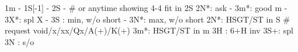 1m - 1S[-1] - 2S -  # or anytime showing 4-4 fit in 2S
2N*: ask
   - 3m*: good m
   - 3X*: spl X
   - 3S : min, w/o short
   - 3N*: max, w/o short
2N*: HSGT/ST in S  # request void/x/xx/Qx/A(+)/K(+)
3m*: HSGT/ST in m  
3H : 6+H inv
3S+: spl
3N : s/o
